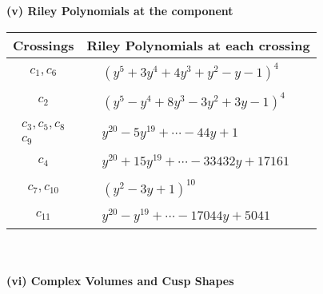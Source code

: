 \documentclass[1p]{elsarticle_modified}
\theoremstyle{definition}
\begin{document}
\newpage\renewcommand{\arraystretch}{1}
\flushleft \textbf{(v) Riley Polynomials at the component}\newline \\
\begin{tabular}{m{50pt}|m{274pt}}
Crossings & \hspace{64pt}Riley Polynomials at each crossing \\
\hline $$\begin{aligned}c_{1},c_{6}\end{aligned}$$&$\begin{aligned}
&(y^5+3 y^4+4 y^3+y^2- y-1)^4
\end{aligned}$\\
\hline $$\begin{aligned}c_{2}\end{aligned}$$&$\begin{aligned}
&(y^5- y^4+8 y^3-3 y^2+3 y-1)^4
\end{aligned}$\\
\hline $$\begin{aligned}c_{3},c_{5},c_{8}\\c_{9}\end{aligned}$$&$\begin{aligned}
&y^{20}-5 y^{19}+\cdots-44 y+1
\end{aligned}$\\
\hline $$\begin{aligned}c_{4}\end{aligned}$$&$\begin{aligned}
&y^{20}+15 y^{19}+\cdots-33432 y+17161
\end{aligned}$\\
\hline $$\begin{aligned}c_{7},c_{10}\end{aligned}$$&$\begin{aligned}
&(y^2-3 y+1)^{10}
\end{aligned}$\\
\hline $$\begin{aligned}c_{11}\end{aligned}$$&$\begin{aligned}
&y^{20}- y^{19}+\cdots-17044 y+5041
\end{aligned}$\\
\hline
\end{tabular}\\~\\
\newpage\flushleft \textbf{(vi) Complex Volumes and Cusp Shapes}
\end{document}
